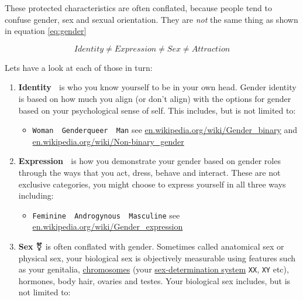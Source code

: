 \documentclass[
]{book}
\providecommand{\tightlist}{%
  \setlength{\itemsep}{0pt}\setlength{\parskip}{0pt}}
\begin{document}
These protected characteristics are often conflated, because people tend to confuse gender, sex and sexual orientation. They are \emph{not} the same thing as shown in equation \eqref{eq:gender}

\begin{equation}
Identity ≠ Expression ≠ Sex ≠ Attraction
  \label{eq:gender}
\end{equation}

Lets have a look at each of those in turn:

\begin{enumerate}
\def\labelenumi{\arabic{enumi}.}
\tightlist
\item
  \textbf{Identity} 🧠 is who you know yourself to be in your own head. Gender identity is based on how much you align (or don't align) with the options for gender based on your psychological sense of self. This includes, but is not limited to:

  \begin{itemize}
  \tightlist
  \item
    \texttt{Woman\ \textbar{}\ Genderqueer\ \textbar{}\ Man} see \href{https://en.wikipedia.org/wiki/Gender_binary}{en.wikipedia.org/wiki/Gender\_binary} and \href{https://en.wikipedia.org/wiki/Non-binary_gender}{en.wikipedia.org/wiki/Non-binary\_gender}
  \end{itemize}
\item
  \textbf{Expression} 🎨 is how you demonstrate your gender based on gender roles through the ways that you act, dress, behave and interact. These are not exclusive categories, you might choose to express yourself in all three ways including:

  \begin{itemize}
  \tightlist
  \item
    \texttt{Feminine\ \textbar{}\ Androgynous\ \textbar{}\ Masculine} see \href{https://en.wikipedia.org/wiki/Gender_expression}{en.wikipedia.org/wiki/Gender\_expression}
  \end{itemize}
\item
  \textbf{Sex} ⚧️ is often conflated with gender. Sometimes called anatomical sex or physical sex, your biological sex is objectively measurable using features such as your genitalia, \href{https://en.wikipedia.org/wiki/Chromosome}{chromosomes} (your \href{https://en.wikipedia.org/wiki/Sex-determination_system}{sex-determination system} \texttt{XX}, \texttt{XY} etc), hormones, body hair, ovaries and testes. Your biological sex includes, but is not limited to:


\end{enumerate}
\end{document}
